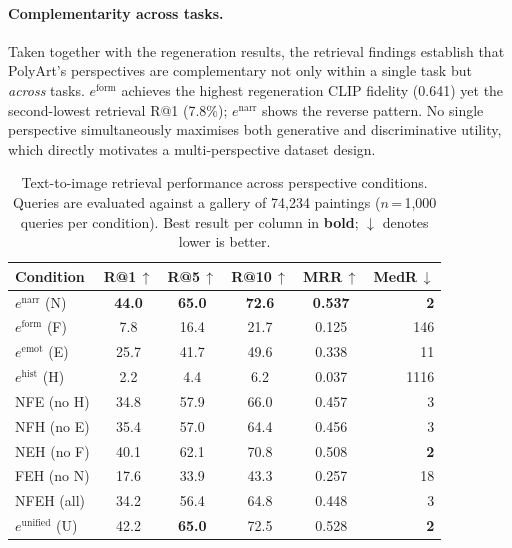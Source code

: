 \paragraph{Complementarity across tasks.}
Taken together with the regeneration results, the retrieval findings establish that PolyArt's perspectives are complementary not only within a single task but \emph{across} tasks.
$e^{\text{form}}$ achieves the highest regeneration CLIP fidelity (0.641) yet the second-lowest retrieval R@1 (7.8\%); $e^{\text{narr}}$ shows the reverse pattern.
No single perspective simultaneously maximises both generative and discriminative utility, which directly motivates a multi-perspective dataset design.

\begin{table}[t]
\centering
\caption{Text-to-image retrieval performance across perspective conditions. Queries are evaluated against a gallery of 74,234 paintings ($n$\,=\,1,000 queries per condition). Best result per column in \textbf{bold}; $\downarrow$ denotes lower is better.}
\label{tab:retrieval}
\setlength{\tabcolsep}{5pt}
\begin{tabular}{lccccr}
\toprule
\textbf{Condition} & \textbf{R@1}\,$\uparrow$ & \textbf{R@5}\,$\uparrow$ & \textbf{R@10}\,$\uparrow$ & \textbf{MRR}\,$\uparrow$ & \textbf{MedR}\,$\downarrow$ \\
\midrule
$e^{\text{narr}}$ (N)  & \textbf{44.0} & \textbf{65.0} & \textbf{72.6} & \textbf{0.537} & \textbf{2} \\
$e^{\text{form}}$ (F)  & 7.8  & 16.4 & 21.7 & 0.125 & 146 \\
$e^{\text{emot}}$ (E)  & 25.7 & 41.7 & 49.6 & 0.338 & 11  \\
$e^{\text{hist}}$ (H)  & 2.2  & 4.4  & 6.2  & 0.037 & 1116 \\
\midrule
NFE (no H) & 34.8 & 57.9 & 66.0 & 0.457 & 3 \\
NFH (no E) & 35.4 & 57.0 & 64.4 & 0.456 & 3 \\
NEH (no F) & 40.1 & 62.1 & 70.8 & 0.508 & \textbf{2} \\
FEH (no N) & 17.6 & 33.9 & 43.3 & 0.257 & 18 \\
\midrule
NFEH (all) & 34.2 & 56.4 & 64.8 & 0.448 & 3 \\
$e^{\text{unified}}$ (U) & 42.2 & \textbf{65.0} & 72.5 & 0.528 & \textbf{2} \\
\bottomrule
\end{tabular}
\end{table}